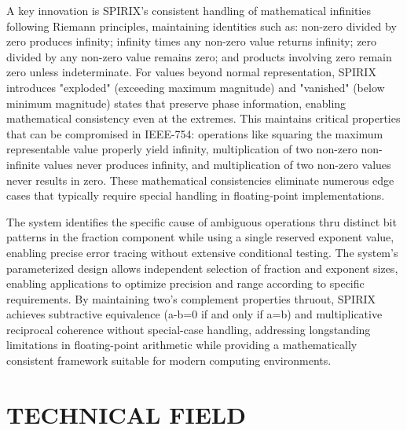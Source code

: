 \documentclass[12pt,letter]{article}
\begin{document}
A key innovation is SPIRIX's consistent handling of mathematical infinities following Riemann principles, maintaining identities such as: non-zero divided by zero produces infinity; infinity times any non-zero value returns infinity; zero divided by any non-zero value remains zero; and products involving zero remain zero unless indeterminate. For values beyond normal representation, SPIRIX introduces "exploded" (exceeding maximum magnitude) and "vanished" (below minimum magnitude) states that preserve phase information, enabling mathematical consistency even at the extremes. This maintains critical properties that can be compromised in IEEE-754: operations like squaring the maximum representable value properly yield infinity, multiplication of two non-zero non-infinite values never produces infinity, and multiplication of two non-zero values never results in zero. These mathematical consistencies eliminate numerous edge cases that typically require special handling in floating-point implementations.

The system identifies the specific cause of ambiguous operations thru distinct bit patterns in the fraction component while using a single reserved exponent value, enabling precise error tracing without extensive conditional testing. The system's parameterized design allows independent selection of fraction and exponent sizes, enabling applications to optimize precision and range according to specific requirements. By maintaining two's complement properties thruout, SPIRIX achieves subtractive equivalence (a-b=0 if and only if a=b) and multiplicative reciprocal coherence without special-case handling, addressing longstanding limitations in floating-point arithmetic while providing a mathematically consistent framework suitable for modern computing environments.

\section*{TECHNICAL FIELD}
\end{document}
